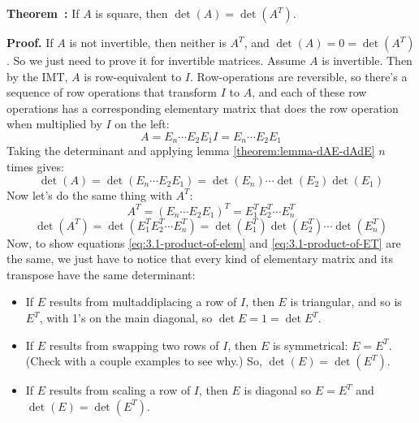 \documentclass[11pt, letterpaper]{report}
\newenvironment{notes}{}{}
\newenvironment{book}{}{}
\newcounter{example}[section]
\newcounter{theorem}[chapter]
\newenvironment{theorem}[1][]{\refstepcounter{theorem}\begin{bbox}\par
    \noindent\textbf{Theorem~\thetheorem: #1}}{\end{bbox}}
\newlength\oldfboxsep%
\newlength\myminiwidth%
\newenvironment{bbox}{%
  \setlength\oldfboxsep\fboxsep
  \setlength{\fboxsep}{.1in}%
  \setlength\myminiwidth\linewidth%
  \addtolength\myminiwidth{-0.2in}%
  \vspace{0.1in}%
  \begin{lrbox}{\bboxbox}\begin{minipage}{\myminiwidth}%
    }{%
    \end{minipage}\end{lrbox}%
  \noindent\fbox{\usebox{\bboxbox}}\vspace{0.1in}\setlength\fboxsep\oldfboxsep%
}
\begin{document}
\begin{theorem} 
\label{theorem:detA-detAT} If $A$ is square, then $\det(A) = \det(A^T)$.
\end{theorem}

\begin{notes}
\vfill 
\end{notes}

\begin{book}
\textbf{Proof.} If $A$ is not invertible, then neither is $A^T$, and $\det(A) = 0 = \det(A^T)$. So we just need to prove it for invertible matrices. Assume $A$ is invertible. Then by the IMT, $A$ is row-equivalent to $I$. Row-operations are reversible, so there's a sequence of row operations that transform $I$ to $A$, and each of these row operations has a corresponding elementary matrix that does the row operation when multiplied by $I$ on the left:
\[ A =E_n\cdots E_2E_1I = E_n\cdots E_2E_1 \] 
Taking the determinant and applying lemma \ref{theorem:lemma-dAE-dAdE} $n$ times gives:
\begin{equation}\label{eq:3.1-product-of-elem}
\det(A) = \det(E_n\cdots E_2E_1) = \det(E_n)\cdots \det(E_2)\det(E_1)
\end{equation}
Now let's do the same thing with $A^T$:
\[A^{T} =  ( E_n\cdots E_2E_1 )^T=E_1^TE_2^T\cdots E_n^T\]%
\begin{equation}\label{eq:3.1-product-of-ET}
\det(A^T) = \det(E_1^TE_2^T\cdots E_n^T) = \det(E_1^T)\det(E_2^T)\cdots\det(E_n^T) 
\end{equation}
Now, to show equations \ref{eq:3.1-product-of-elem} and \ref{eq:3.1-product-of-ET} are the same, we just have to notice that every kind of elementary matrix and its transpose have the same determinant:
\begin{itemize}
\item If $E$ results from multaddiplacing a row of $I$, then $E$ is triangular, and so is $E^T$, with 1's on the main diagonal, so $\det E = 1 = \det E^T$.
\item If $E$ results from swapping two rows of $I$, then $E$ is symmetrical: $E =E^T$. (Check with a couple examples to see why.) So, $\det(E) = \det(E^T)$. %
\item If $E$ results from scaling a row of $I$, then $E$ is diagonal so $E = E^T$ and $\det(E) = \det(E^T)$.
\end{itemize}
\blacksquare
\end{book}
\end{document}
